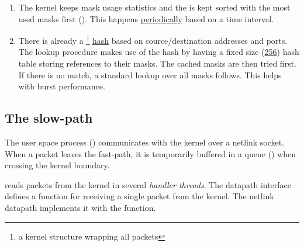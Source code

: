 \begin{enumerate}
\def\labelenumi{\arabic{enumi}.}
\item
  The kernel keeps mask usage statistics and the  is
  kept sorted with the most used masks first
  (\href{https://elixir.bootlin.com/linux/v6.2.5/source/net/openvswitch/flow_table.c\#L1107}{}).
  This happens
  \href{https://elixir.bootlin.com/linux/v6.2.5/source/net/openvswitch/datapath.c\#L2536}{periodically}
  based on a time interval.
\item
  There is already a \footnote{a kernel structure wrapping all packets}
  \href{https://elixir.bootlin.com/linux/v6.2.5/source/include/linux/skbuff.h\#L1537}{hash}
  based on source/destination addresses and ports. The lookup procedure
  makes use of the hash by having a fixed size
  (\href{https://elixir.bootlin.com/linux/v6.2.5/source/net/openvswitch/flow_table.c\#L41}{256})
  hash table storing references to their masks. The cached masks are
  then tried first. If there is no match, a standard lookup over all masks
  follows. This helps with burst performance.
\end{enumerate}

\subsection{The slow-path}

The user space process (\href{https://www.man7.org/linux/man-pages/man8/ovs-vswitchd.8.html}{}) communicates with the kernel over a netlink socket. When a packet leaves the
fast-path, it is temporarily buffered in a queue (\href{https://elixir.bootlin.com/linux/v6.2.6/source/net/openvswitch/datapath.c\#L311}{}) when crossing the kernel boundary.

 reads packets from the kernel in several \emph{handler threads}. The datapath interface defines a \href{https://github.com/openvswitch/ovs/blob/e90a0727f17f6ad915a32735a8c0b282f2c8cd6f/lib/dpif-provider.h\#L387-L408}{} function for receiving a single packet from the kernel. The netlink datapath implements it with the \href{https://github.com/openvswitch/ovs/blob/e90a0727f17f6ad915a32735a8c0b282f2c8cd6f/lib/dpif-netlink.c\#L3132-L3134}{} function.

